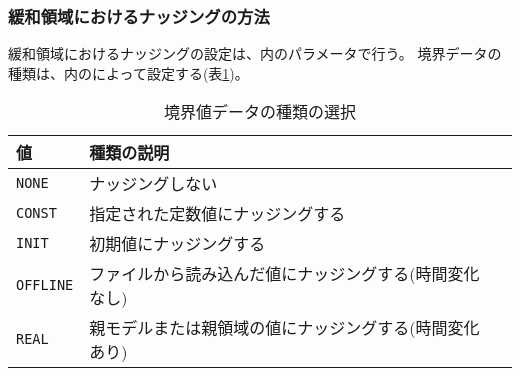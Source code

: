 \subsubsection{緩和領域におけるナッジングの方法}

緩和領域におけるナッジングの設定は、内のパラメータで行う。
境界データの種類は、内のによって設定する(表\ref{tab:nml_atmos_boundary_type})。

\begin{table}[h]
\begin{center}
\caption{境界値データの種類の選択}
\label{tab:nml_atmos_boundary_type}
\begin{tabularx}{150mm}{lXX} \hline
  \rowcolor[gray]{0.9} 値 & 種類の説明 \\ \hline
  \verb|NONE|    & ナッジングしない \\
  \verb|CONST|   & 指定された定数値にナッジングする \\
  \verb|INIT|    & 初期値にナッジングする \\
  \verb|OFFLINE| & ファイルから読み込んだ値にナッジングする(時間変化なし) \\
  \verb|REAL|    & 親モデルまたは親領域の値にナッジングする(時間変化あり) \\
  \hline
\end{tabularx}
\end{center}
\end{table}



